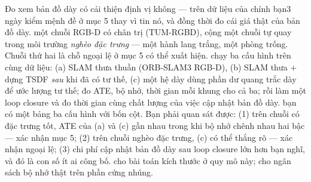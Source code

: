 \documentclass[../../vslam.tex]{subfiles}
\begin{document}
\begin{duan}{Đo xem bản đồ dày có cải thiện định vị không --- trên dữ liệu của chính bạn}{3 ngày}
\dmt kiểm mệnh đề ở mục 5 thay vì tin nó, và đồng thời đo cái giá thật của bản đồ dày.
\ddl một chuỗi RGB-D có chân trị (TUM-RGBD), cộng một chuỗi tự quay trong môi trường \emph{nghèo đặc trưng} --- một hành lang trắng, một phòng trống. Chuỗi thứ hai là chỗ ngoại lệ ở mục 5 có thể xuất hiện.
\dbc chạy ba cấu hình trên cùng dữ liệu: (a) SLAM thưa thuần (ORB-SLAM3 RGB-D), (b) SLAM thưa \(+\) dựng TSDF \emph{sau} khi đã có tư thế, (c) một hệ dày dùng phần dư quang trắc dày để ước lượng tư thế; đo ATE, bộ nhớ, thời gian mỗi khung cho cả ba; rồi làm một loop closure và đo thời gian cùng chất lượng của việc cập nhật bản đồ dày.
\dxk bạn có một bảng ba cấu hình với bốn cột. Bạn phải quan sát được: (1) trên chuỗi có đặc trưng tốt, ATE của (a) và (c) gần nhau trong khi bộ nhớ chênh nhau hai bậc --- xác nhận mục 5; (2) trên chuỗi nghèo đặc trưng, (c) có thể thắng rõ --- xác nhận ngoại lệ; (3) chi phí cập nhật bản đồ dày sau loop closure lớn hơn bạn nghĩ, và đó là con số ít ai công bố.
\dnv {} cho bài toán kích thước ở quy mô này;  cho ngân sách bộ nhớ thật trên phần cứng nhúng.
\end{duan}
\end{document}
